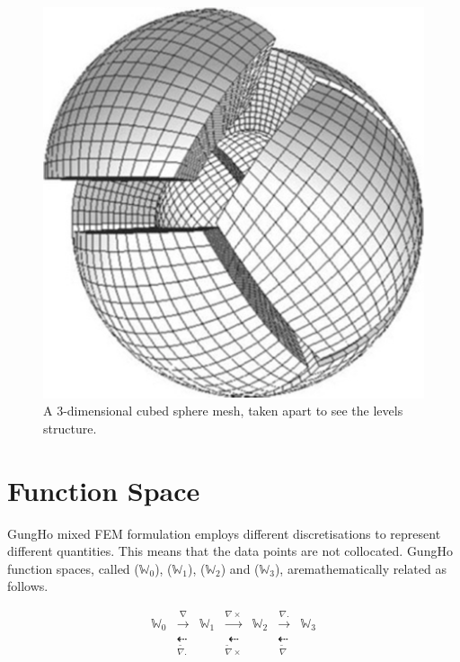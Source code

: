 \documentclass{report}
\begin{document}
\begin{figure}
\begin{centering}
\includegraphics[scale=0.5]{lfricdoc_figures/cubed_sphere.eps}
\protect\caption{\label{fig:cubed_sphere}A 3-dimensional cubed sphere mesh, taken apart to see the levels structure.}
\par\end{centering}
\end{figure}

\section{Function Space}

GungHo mixed FEM formulation employs different discretisations to represent
different quantities. This means that the data points are not collocated. 
GungHo function spaces, called ($\mathbb{W}_0$), ($\mathbb{W}_1$), ($\mathbb{W}_2$) 
and ($\mathbb{W}_3$), aremathematically related as follows.

\begin{equation}
\begin{array}{ccccccc}
\mathbb{W}_{0} & \overset{\nabla}{\longrightarrow} & \mathbb{W}_{1} & \overset{\nabla\times}{\longrightarrow} & \mathbb{W}_{2} & \overset{\nabla.}{\longrightarrow} & \mathbb{W}_{3}\\
 & \underset{\tilde{\nabla.}}{\dashleftarrow} &  & \underset{\tilde{\nabla}\times}{\dashleftarrow} &  & \underset{\tilde{\nabla}}{\dashleftarrow}
\end{array}\label{eq:derham_complex}
\end{equation}
\end{document}
